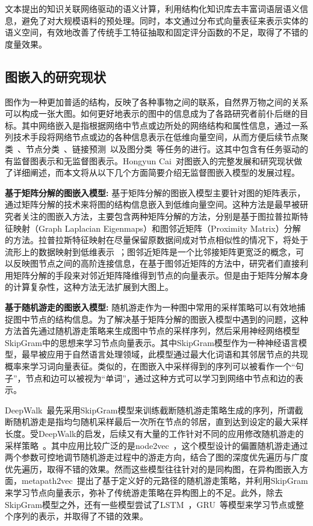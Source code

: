 文本提出的知识关联网络驱动的语义计算，利用结构化知识库去丰富词语层语义信息，避免了对大规模语料的预处理。同时，本文通过分布式向量表征来表示实体的语义空间，有效地改善了传统手工特征抽取和固定评分函数的不足，取得了不错的度量效果。

\subsection{图嵌入的研究现状}
图作为一种更加普适的结构，反映了各种事物之间的联系，自然界万物之间的关系可以构成一张大图。如何更好地表示的图中的信息成为了各路研究者前仆后继的目标。其中网络嵌入是指根据网络中节点或边所处的网络结构和属性信息，通过一系列技术手段将网络节点或边的各种信息表示在低维向量空间，从而方便后续节点聚类~\cite{aaai/NieZL17}、节点分类~\cite{aaai/WangCWP0Y17}、链接预测~\cite{www/WeiXCY17}以及图分类~\cite{nips/DefferrardBV16}等任务的进行。这其中包含有任务驱动的有监督图表示和无监督图表示。Hongyun Cai~\cite{tkde/CaiZC18}对图嵌入的完整发展和研究现状做了详细阐述，而本文将从以下几个方面简要介绍无监督图嵌入模型的发展过程。

\textbf{基于矩阵分解的图嵌入模型:}
基于矩阵分解的图嵌入模型主要针对图的矩阵表示，通过矩阵分解的技术来将图的结构信息嵌入到低维向量空间。这种方法是最早被研究者关注的图嵌入方法，主要包含两种矩阵分解的方法，分别是基于图拉普拉斯特征映射（Graph Laplacian Eigenmaps）和图邻近矩阵（Proximity Matrix）分解的方法。拉普拉斯特征映射在尽量保留原数据间成对节点相似性的情况下，将处于流形上的数据映射到低维表示~\cite{nips/HofmannB94, nips/HeN03, mm/CaiHH07}；图邻近矩阵是一个比邻接矩阵更宽泛的概念，可以反映图节点之间的高阶连接信息，在基于图邻近矩阵的方法中，研究者们直接利用矩阵分解的手段来对邻近矩阵降维得到节点的向量表示\cite{NM/Golub70, nips/HofmannB94}。但是由于矩阵分解本身的计算复杂性，这种方法无法扩展到大图上。

\textbf{基于随机游走的图嵌入模型:}
随机游走作为一种图中常用的采样策略可以有效地捕捉图中节点的结构信息。为了解决基于矩阵分解的图嵌入模型中遇到的问题，这种方法首先通过随机游走策略来生成图中节点的采样序列，然后采用神经网络模型SkipGram\cite{corr/Mikolov13}中的思想来学习节点向量表示。其中SkipGram模型作为一种神经语言模型，最早被应用于自然语言处理领域，此模型通过最大化词语和其邻居节点的共现概率来学习词向量表征。类似的，在图嵌入中采样得到的序列可以被看作一个“句子”，节点和边可以被视为“单词”，通过这种方式可以学习到网络中节点和边的表示。

DeepWalk~\cite{kdd/Perozzi14}最先采用SkipGram模型来训练截断随机游走策略生成的序列，所谓截断随机游走是指均匀随机采样最后一次所在节点的邻居，直到达到设定的最大采样长度。受DeepWalk的启发，后续又有大量的工作针对不同的应用修改随机游走的采样策略~\cite{ijcnn/JinLLZZW16, kdd/GroverL16, icml/YangCS16}。其中应用比较广泛的是node2vec~\cite{kdd/GroverL16}，这个模型设计的偏置随机游走通过两个参数可控地调节随机游走过程中的游走方向，结合了图的深度优先遍历与广度优先遍历，取得不错的效果。然而这些模型往往针对的是同构图，在异构图嵌入方面，metapath2vec~\cite{kdd/DongCS17}提出了基于定义好的元路径的随机游走策略，并利用SkipGram来学习节点向量表示，弥补了传统游走策略在异构图上的不足。此外，除去SkipGram模型之外，还有一些模型尝试了LSTM~\cite{neco/HochreiterS97}，GRU~\cite{ssst/ChoMBB14}等模型来学习节点或整个序列的表示\cite{aaai/LiuZZZCWY17, www/LiMGM17}，并取得了不错的效果。

